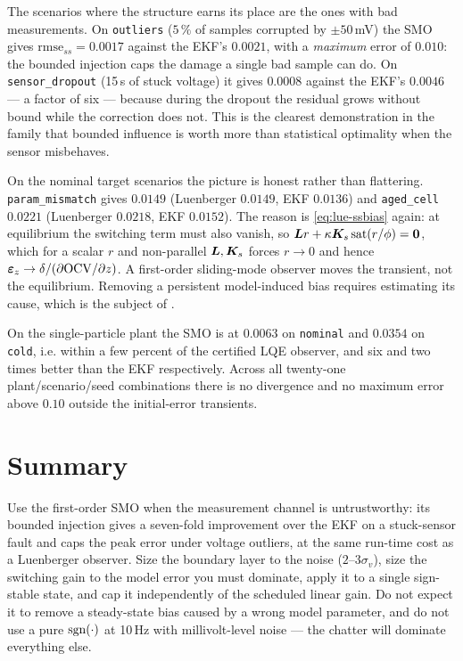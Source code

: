 The scenarios where the structure earns its place are the ones with bad measurements.  On
\texttt{outliers} ($5\,\%$ of samples corrupted by $\pm50$\,mV) the SMO gives
$\mathrm{rmse}_{ss}=0.0017$ against the EKF's $0.0021$, with a \emph{maximum} error of $0.010$:
the bounded injection caps the damage a single bad sample can do.  On \texttt{sensor\_dropout}
(15\,s of stuck voltage) it gives $0.0008$ against the EKF's $0.0046$ --- a factor of six ---
because during the dropout the residual grows without bound while the correction does not.  This is the clearest demonstration
in the family that bounded influence is worth more than statistical optimality when the sensor
misbehaves.

On the nominal target scenarios the picture is honest rather than flattering.
\texttt{param\_mismatch} gives $0.0149$ (Luenberger $0.0149$, EKF $0.0136$) and
\texttt{aged\_cell} $0.0221$ (Luenberger $0.0218$, EKF $0.0152$).  The reason is
\eqref{eq:lue-ssbias} again: at equilibrium the switching term must also vanish, so
$\bm{L} r + \kappa\bm{K}_s\operatorname{sat}(r/\phi) = \bm{0}$, which for a scalar $r$ and non-parallel $\bm{L},\bm{K}_s$
forces $r\to0$ and hence $\bm{\varepsilon}_{z}\to\delta/(\partial\mathrm{OCV}/\partial z)$.  A first-order
sliding-mode observer moves the transient, not the equilibrium.  Removing a persistent
model-induced bias requires estimating its cause, which is the subject of
.

On the single-particle plant the SMO is at $0.0063$ on \texttt{nominal} and $0.0354$ on
\texttt{cold}, i.e. within a few percent of the certified LQE observer, and six and two times
better than the EKF respectively.  Across all twenty-one plant/scenario/seed combinations there
is no divergence and no maximum error above $0.10$ outside the initial-error transients.

\section{Summary}
Use the first-order SMO when the measurement channel is untrustworthy: its bounded injection
gives a seven-fold improvement over the EKF on a stuck-sensor fault and caps the peak error under
voltage outliers, at the same run-time cost as a Luenberger observer.  Size the boundary layer to
the noise ($2$--$3\sigma_v$), size the switching gain to the model error you must dominate, apply
it to a single sign-stable state, and cap it independently of the scheduled linear gain.  Do not
expect it to remove a steady-state bias caused by a wrong model parameter, and do not use a pure
$\operatorname{sgn}(\cdot)$ at 10\,Hz with millivolt-level noise --- the chatter will dominate everything else.
